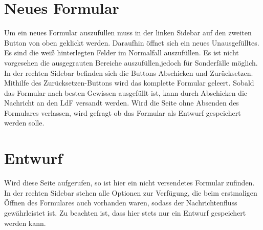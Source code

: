 \documentclass[a4paper,11pt,oneside, titlepage]{article}
\begin{document}
	\section{Neues Formular}
	Um ein neues Formular auszufüllen muss in der linken Sidebar auf den zweiten Button von oben geklickt werden. Daraufhin öffnet sich ein neues Unausgefülltes. Es sind die weiß hinterlegten Felder im Normalfall auszufüllen. Es ist nicht vorgesehen die ausgegrauten Bereiche auszufüllen,jedoch für Sonderfälle möglich.
	\newline
	In der rechten Sidebar befinden sich die Buttons \glqq{}Abschicken\grqq{} und \glqq{}Zurücksetzen\grqq{}.
	Mithilfe des Zurücksetzen-Buttons wird das komplette Formular geleert. Sobald das Formular nach besten Gewissen ausgefüllt ist, kann durch \glqq{} Abschicken \grqq{} die Nachricht an den LdF versandt werden.
	\newline
	Wird die Seite ohne Absenden des Formulares verlassen, wird gefragt ob das Formular als Entwurf gespeichert werden solle.
	
	\section{Entwurf}
	Wird diese Seite aufgerufen, so ist hier ein nicht versendetes Formular zufinden. In der rechten Sidebar stehen alle Optionen zur Verfügung, die beim erstmaligen Öffnen des Formulares auch vorhanden waren, sodass der Nachrichtenfluss gewährleistet ist.
	\newline
	Zu beachten ist, dass hier stets nur ein Entwurf gespeichert werden kann. 
	
\end{document}
